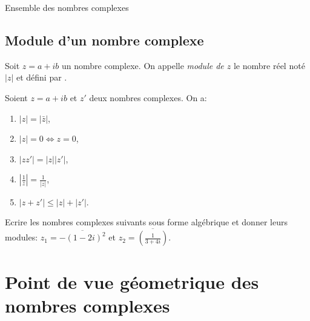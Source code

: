 \begin{chapter}{Ensemble des nombres complexes}
\subsection{Module d'un nombre complexe}
%
%
\begin{defi}
Soit $z = a + i b$ un nombre complexe.
On appelle \emph{module de $z$} le nombre r\'eel not\'e $| z |$ et d\'efini par 
.
\end{defi}
%
\begin{prop}
	\label{prp:proprietes du module}
	Soient $z = a + i b$ et $z'$ deux nombres complexes. On a:
	\begin{enumerate}
		\item $|z| = |\bar{z}|$,
		\item $|z| = 0 \iff z = 0$,
		\item $|z z'| = |z| |z'|$,
		\item $|\frac{1}{z}| = \frac{1}{|z|}$,
		\item $|z+z'| \leq |z| + |z'|$.
		      \label{prp:proprietes du module, inegalite triangulaire}
	\end{enumerate}
\end{prop}
%
\begin{exe}
\label{exe:forme algebrique et modules}
Ecrire les nombres complexes suivants sous forme alg\'ebrique et donner leurs modules:
$ z_1 = \overline{- (1 - 2 i)^2} $ et
$ z_2 = \overline{\left( \frac{1}{3 + 4i} \right) }$.

\end{exe}
%
\section{Point de vue g\'eometrique des nombres complexes}

\end{chapter}
